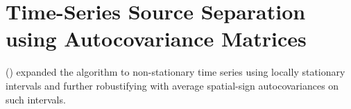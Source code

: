 \documentclass[utf8,english]{gradu3}
\begin{document}
\section{Time-Series Source Separation using Autocovariance Matrices}



\citeauthor{nordhausen2014robustifying} (\citeyear{nordhausen2014robustifying}) expanded the algorithm to non-stationary time series using locally stationary intervals and further robustifying with average spatial-sign autocovariances on such intervals.

\printbibliography
\end{document}
